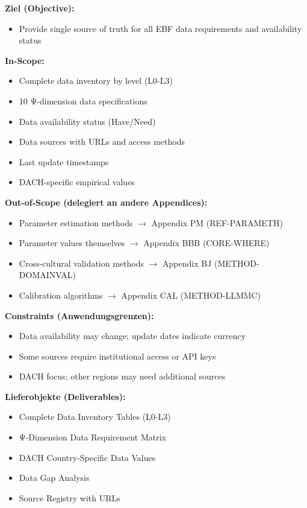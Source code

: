 \begin{tcolorbox}[
    colback=orange!5!white,
    colframe=orange!75!black,
    title={\textbf{Appendix Scope: Ziel / In-Scope / Out-of-Scope / Constraints}},
    fonttitle=\bfseries
]

\textbf{Ziel (Objective):}
\begin{itemize}[nosep]
    \item Provide single source of truth for all EBF data requirements and availability status
\end{itemize}

\textbf{In-Scope:}
\begin{itemize}[nosep]
    \item Complete data inventory by level (L0-L3)
    \item 10 Ψ-dimension data specifications
    \item Data availability status (Have/Need)
    \item Data sources with URLs and access methods
    \item Last update timestamps
    \item DACH-specific empirical values
\end{itemize}

\textbf{Out-of-Scope (delegiert an andere Appendices):}
\begin{itemize}[nosep]
    \item Parameter estimation methods $\rightarrow$ Appendix PM (REF-PARAMETH)
    \item Parameter values themselves $\rightarrow$ Appendix BBB (CORE-WHERE)
    \item Cross-cultural validation methods $\rightarrow$ Appendix BJ (METHOD-DOMAINVAL)
    \item Calibration algorithms $\rightarrow$ Appendix CAL (METHOD-LLMMC)
\end{itemize}

\textbf{Constraints (Anwendungsgrenzen):}
\begin{itemize}[nosep]
    \item Data availability may change; update dates indicate currency
    \item Some sources require institutional access or API keys
    \item DACH focus; other regions may need additional sources
\end{itemize}

\textbf{Lieferobjekte (Deliverables):}
\begin{itemize}[nosep]
    \item Complete Data Inventory Tables (L0-L3)
    \item Ψ-Dimension Data Requirement Matrix
    \item DACH Country-Specific Data Values
    \item Data Gap Analysis
    \item Source Registry with URLs
\end{itemize}

\end{tcolorbox}


